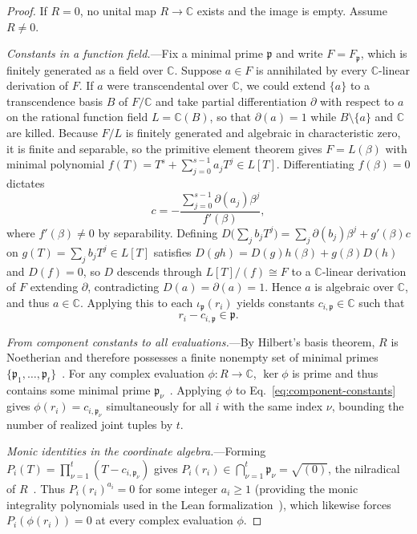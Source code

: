 \documentclass[aps,prl,reprint,notitlepage,nofootinbib,nobibnotes]{revtex4-2}
\begin{document}
\begin{proof}
If \(R=0\), no unital map \(R\to\mathbb C\) exists and the image is empty. Assume \(R\ne0\).

\emph{Constants in a function field.}---Fix a minimal prime \(\mathfrak p\) and write \(F=F_{\mathfrak p}\), which is finitely generated as a field over \(\mathbb C\). Suppose \(a\in F\) is annihilated by every \(\mathbb C\)-linear derivation of \(F\). If \(a\) were transcendental over \(\mathbb C\), we could extend \(\{a\}\) to a transcendence basis \(B\) of \(F/\mathbb C\) and take partial differentiation \(\partial\) with respect to \(a\) on the rational function field \(L=\mathbb C(B)\), so that \(\partial(a)=1\) while \(B\setminus\{a\}\) and \(\mathbb C\) are killed. Because \(F/L\) is finitely generated and algebraic in characteristic zero, it is finite and separable, so the primitive element theorem gives \(F=L(\beta)\) with minimal polynomial \(f(T)=T^s+\sum_{j=0}^{s-1}a_jT^j\in L[T]\). Differentiating \(f(\beta)=0\) dictates
\[
 c=-\frac{\sum_{j=0}^{s-1}\partial(a_j)\beta^j}{f'(\beta)},
\]
where \(f'(\beta)\ne 0\) by separability. Defining \(D\bigl(\sum_j b_jT^j\bigr)=\sum_j\partial(b_j)\beta^j+g'(\beta)c\) on \(g(T)=\sum_j b_jT^j\in L[T]\) satisfies \(D(gh)=D(g)h(\beta)+g(\beta)D(h)\) and \(D(f)=0\), so \(D\) descends through \(L[T]/(f)\cong F\) to a \(\mathbb C\)-linear derivation of \(F\) extending \(\partial\), contradicting \(D(a)=\partial(a)=1\). Hence \(a\) is algebraic over \(\mathbb C\), and thus \(a\in\mathbb C\). Applying this to each \(\iota_{\mathfrak p}(r_i)\) yields constants \(c_{i,\mathfrak p}\in\mathbb C\) such that
\begin{equation}\label{eq:component-constants}
 r_i-c_{i,\mathfrak p}\in\mathfrak p.
\end{equation}

\emph{From component constants to all evaluations.}---By Hilbert's basis theorem, \(R\) is Noetherian and therefore possesses a finite nonempty set of minimal primes \(\{\mathfrak p_1,\ldots,\mathfrak p_t\}\)~\cite{Stacks}. For any complex evaluation \(\phi:R\to\mathbb C\), \(\ker\phi\) is prime and thus contains some minimal prime \(\mathfrak p_\nu\)~\cite{Stacks}. Applying \(\phi\) to Eq.~\eqref{eq:component-constants} gives \(\phi(r_i)=c_{i,\mathfrak p_\nu}\) simultaneously for all \(i\) with the same index \(\nu\), bounding the number of realized joint tuples by \(t\).

\emph{Monic identities in the coordinate algebra.}---Forming \(P_i(T)=\prod_{\nu=1}^{t}(T-c_{i,\mathfrak p_\nu})\) gives \(P_i(r_i)\in\bigcap_{\nu=1}^{t}\mathfrak p_\nu=\sqrt{(0)}\), the nilradical of \(R\)~\cite{Stacks}. Thus \(P_i(r_i)^{a_i}=0\) for some integer \(a_i\ge1\) (providing the monic integrality polynomials used in the Lean formalization~\cite{LeanRepo}), which likewise forces \(P_i(\phi(r_i))=0\) at every complex evaluation \(\phi\).
\end{proof}
\end{document}
